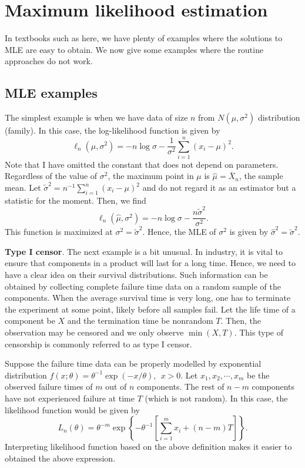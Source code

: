 \chapter{Maximum likelihood estimation}

In textbooks such as here, we have plenty of examples where the
solutions to MLE are easy to obtain. We now give some
examples where the routine approaches do not work.

\section{MLE examples}
The simplest example is when we have \iid data
of size $n$ from $N(\mu, \sigma^2)$ distribution (family). 
In this case, the log-likelihood function is given by
\[
\ell_n(\mu, \sigma^2)
=
- n \log \sigma
- 
\frac{1}{\sigma^2} \sum_{i=1}^n (x_i - \mu)^2.
\]
Note that I have omitted the constant that does not depend on
parameters. 
Regardless of the value of $\sigma^2$, the maximum point
in $\mu$ is $\hat \mu = \bar X_n$, the sample mean.
Let $\tilde \sigma^2 = n^{-1} \sum_{i=1}^n (x_i - \mu)^2$
and do not regard it as an estimator but a statistic for the
moment. Then, we find
\[
\ell_n(\hat \mu, \sigma^2)
=
- n \log \sigma
- 
\frac{n \tilde \sigma^2}{\sigma^2}.
\]
This function is maximized at $\sigma^2 = \tilde \sigma^2$.
Hence, the MLE of $\sigma^2$ is given by
$\hat \sigma^2 = \tilde \sigma^2$.

\vs
\noindent
{\bf Type I censor}.
The next example is a bit unusual.
In industry, it is vital to ensure that components in a product will last
for a long time. Hence, we need to have a clear idea on their survival distributions.
Such information can be obtained by collecting complete failure time
data on a random sample of the components. 
When the average survival time
is very long, one has to terminate the experiment at some point,
likely before all samples fail.
Let the life time of a component be $X$ and the termination time be nonrandom $T$.
Then, the observation may be censored and we only observe $\min(X, T)$.
This type of censorship is commonly referred to as type I censor.

Suppose the failure time data can be properly modelled by exponential
distribution $f(x; \theta) = \theta^{-1} \exp( - x/\theta), ~~x > 0$.
Let $x_1, x_2, \cdots, x_m$ be the observed failure times of $m$ out of
$n$ components. The rest of $n-m$ components have not experienced
failure at time $T$ (which is not random).
In this case, the likelihood function would be given by
\[
L_n(\theta) 
= \theta^{-m} \exp\left \{ - \theta^{-1} [ \sum_{i=1}^m x_i + (n-m) T] \right \}.
\]
Interpreting likelihood function based on the above
definition makes it easier to obtained the above expression.

